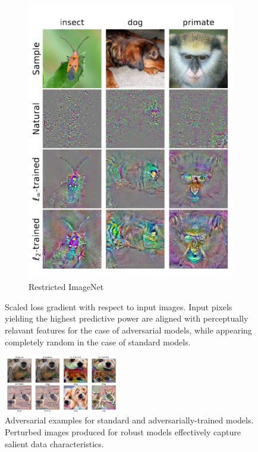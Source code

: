 \begin{figure}[H]
\begin{subfigure}[b]{0.28\textwidth}
        \includegraphics[width=\textwidth]{img/introduction/adversarial_loss_2.jpg}
        \caption{Restricted ImageNet}
    \end{subfigure}
       \caption{Scaled loss gradient with respect to input images.
       Input pixels yielding the highest predictive power are aligned 
       with perceptually relavant features for the case of adversarial
       models, while appearing completely random in the case of 
       standard models.
       \cite{tsiprasRobustnessMayBe2019}}
       \label{fig:adversarial_loss}
\end{figure}


\begin{figure}[H]
    \centering
    \includegraphics[width=0.45\textwidth]{img/introduction/adversarial_salient.png}
    \caption{Adversarial examples for standard and adversarially-trained models.
    Perturbed images produced for robust models 
    effectively capture salient data characteristics.
    \cite{tsiprasRobustnessMayBe2019}}
    \label{fig:salient_characteristics}
\end{figure}

